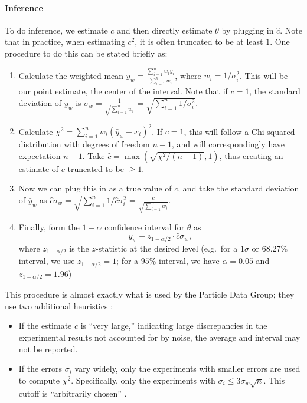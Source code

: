 \documentclass[12pt]{article}
\begin{document}
\paragraph{Inference}\label{inference-2}

To do inference, we estimate $c$ and then directly estimate $\theta$ by plugging in $\hat c$. Note that in practice, when estimating $c^2$, it is often truncated to be at least $1$. One procedure to do this can be stated briefly as:

\begin{enumerate}
\item
  Calculate the weighted mean $\bar{y}_w=\frac{\sum_{i=1}^n w_iy_i}{\sum_{i=1}^nw_i}$, where $w_i=1/\sigma_i^2$. This will be our point estimate, the center of the interval. Note that if $c=1$, the standard deviation of $\bar{y}_w$ is $\sigma_w=\frac{1}{\sqrt{\sum_{i=1}^nw_i}}=\sqrt{\sum_{i=1}^n1/\sigma_i^2}$.
\item
  Calculate $\chi^2=\sum_{i=1}^n w_i(\bar{y}_w-x_i)^2$. If $c=1$, this will follow a Chi-squared distribution with degrees of freedom $n-1$, and will correspondingly have expectation $n-1$. Take $\hat c=\max(\sqrt{\chi^2/(n-1)},1)$, thus creating an estimate of $c$ truncated to be $\geq 1$.
\item
  Now we can plug this in as a true value of $c$, and take the standard deviation of $\bar{y}_w$ as $\hat c\sigma_w=\sqrt{\sum_{i=1}^n1/\hat c\sigma_i^2}=\frac{\hat c}{\sqrt{\sum_{i=1}^nw_i}}$.
\item
  Finally, form the $1-\alpha$ confidence interval for $\theta$ as \[\bar{y}_w\pm z_{1-{\alpha/2}}\cdot \hat c\sigma_w,\] where $z_{1-\alpha/2}$ is the $z$-statistic at the desired level (e.g.~for a $1\sigma$ or $68.27\%$ interval, we use $z_{1-\alpha/2}=1$; for a $95\%$ interval, we have $\alpha=0.05$ and $z_{1-\alpha/2}=1.96$)
\end{enumerate}

This procedure is almost exactly what is used by the Particle Data Group; they use two additional heuristics \citep[Section 5.2.2]{navas2024review}:

\begin{itemize}

\item
  If the estimate $\hat c$ is ``very large,'' indicating large discrepancies in the experimental results not accounted for by noise, the average and interval may not be reported.
\item
  If the errors $\sigma_i$ vary widely, only the experiments with smaller errors are used to compute $\chi^2$. Specifically, only the experiments with $\sigma_i\leq 3\sigma_w\sqrt{n}$. This cutoff is ``arbitrarily chosen'' \citep[Section 5.2.2]{navas2024review}.
\end{itemize}
\end{document}
